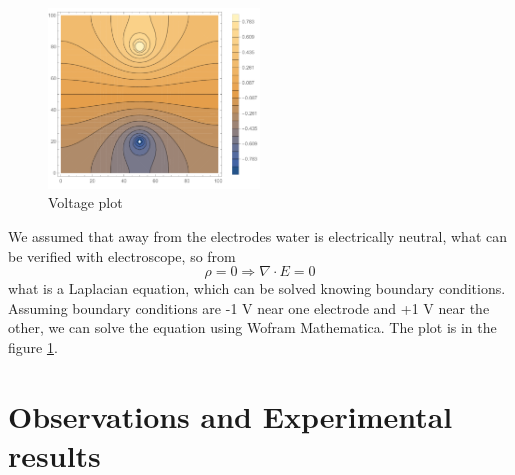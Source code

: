 \documentclass{article}
\begin{document}
\begin{figure}[h]
    \centering
    \includegraphics[width=0.5\textwidth]{theory plot.pdf}
    \caption{Voltage plot}
    \label{fig:mesh3}
\end{figure}

We assumed that away from the electrodes water is electrically neutral, what can be verified with electroscope, so from $$\rho = 0 \Rightarrow \nabla \cdot E = 0$$ what is a Laplacian equation, which can be solved knowing boundary conditions. Assuming boundary conditions are -1 V near one electrode and +1 V near the other, we can solve the equation using Wofram Mathematica. The plot is in the figure \ref{fig:mesh3}. \par



\section{Observations and Experimental results}
\end{document}
